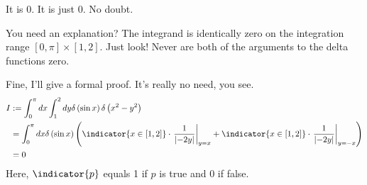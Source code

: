 \item

It is 0. It is just 0. No doubt.

You need an explanation?
The integrand is identically zero on the integration range $[0, \pi] \times [1, 2]$.
Just look! Never are both of the arguments to the delta functions zero.

Fine, I'll give a formal proof. It's really no need, you see.
\begin{align*}
    I
    &:= \int_0^\pi dx \int_1^2 dy \delta\left( \sin x \right) \delta\left( x^2 - y^2 \right) \\
    &= \int_0^\pi dx \delta\left( \sin x \right) \left(
        \indicator{x \in [1,2]} \cdot \evalAt{\inv{\abs{-2y}}}{y = x}
        + \indicator{x \in [1,2]} \cdot \evalAt{\inv{\abs{-2y}}}{y = -x}
    \right) \\
    &= 0
\end{align*}
Here, $\indicator{p}$ equals 1 if $p$ is true and 0 if false.